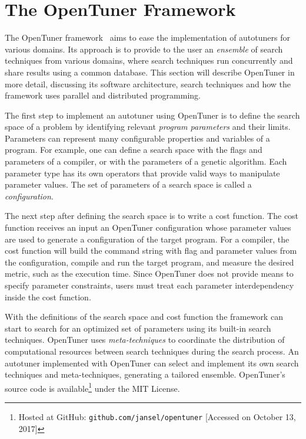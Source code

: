 \section{The OpenTuner Framework}
\label{sec:opentuner}

The OpenTuner framework~\cite{ansel2014opentuner}  aims to ease the
implementation of autotuners for various domains. Its approach is to provide to
the user an \emph{ensemble} of search techniques from various domains, where
search techniques run concurrently and share results using a common database.
This section will describe OpenTuner in more detail, discussing its software
architecture, search techniques and how the framework uses parallel and
distributed programming.

The first step to implement an autotuner using OpenTuner is to define the
search space of a problem by identifying relevant \emph{program parameters} and
their limits. Parameters can represent many configurable properties and
variables of a program. For example, one can define a search space with the
flags and parameters of a compiler, or with the parameters of a genetic
algorithm.  Each parameter type has its own operators that provide valid
ways to manipulate parameter values.  The set of parameters of a search space
is called a \emph{configuration}.

The next step after defining the search space is to write a cost function.  The
cost function receives an input an OpenTuner configuration whose parameter
values are used to generate a configuration of the target program.  For a
compiler, the cost function will build the command string with flag and
parameter values from the configuration, compile and run the target program,
and measure the desired metric, such as the execution time.  Since OpenTuner
does not provide means to specify parameter constraints, users must treat each
parameter interdependency inside the cost function.

With the definitions of the search space and cost function the framework can
start to search for an optimized set of parameters using its built-in search
techniques.  OpenTuner uses \emph{meta-techniques} to coordinate the
distribution of computational resources between search techniques during the
search process. An autotuner implemented with OpenTuner can select and
implement its own search techniques and meta-techniques, generating a tailored
ensemble.  OpenTuner's source code is available\footnote{Hosted at GitHub:
\texttt{\scriptsize github.com/jansel/opentuner} [Accessed on October 13,
2017]} under the MIT License.

